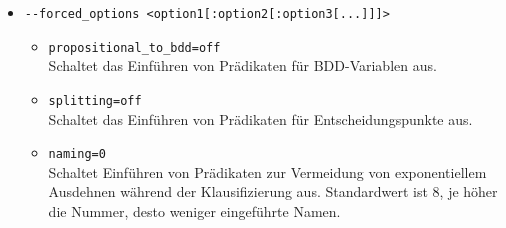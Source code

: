 \documentclass{article}
\newcommand{\vampire}{\textsc{Vampire}~}
\begin{document}
\begin{itemize}
	Stellt das ansonsten von \vampire veränderbare maximale Klauselgewicht ein. \vampire kann bei Speicherknappheit oder bei nutzen der \emph{limited resource strategy} das Maximum ansonsten automatisch verringern um schwere Klauseln zu verwerfen.
	\item \verb|--forced_options <option1[:option2[:option3[...]]]>| \label{arg:forcedoptions}\\
	\begin{itemize}
		\item \verb|propositional_to_bdd=off| \\
		Schaltet das Einführen von Prädikaten für BDD-Variablen aus.
		\item \verb|splitting=off| \\
		Schaltet das Einführen von Prädikaten für Entscheidungspunkte aus.
		
		%
		
		\item \verb|naming=0| \\
		Schaltet Einführen von Prädikaten zur Vermeidung von exponentiellem Ausdehnen während der Klausifizierung aus.
		Standardwert ist 8, je höher die Nummer, desto weniger eingeführte Namen.\\
	\end{itemize}


\end{itemize}
\end{document}
